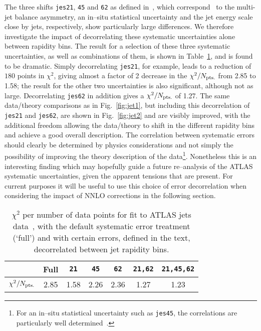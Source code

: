\documentclass{appolb}
\begin{document}
The three shifts \texttt{jes21}, \texttt{45} and \texttt{62} as defined in~\cite{Aad:2014bia}, which correspond~\cite{ATLASpriv} to the multi-jet balance asymmetry, an in--situ statistical uncertainty and the jet energy scale close by jets, respectively, show particularly large differences. We therefore investigate the impact of decorrelating these systematic uncertainties alone between rapidity bins. The result for a selection of these three systematic uncertainties, as well as combinations of them, is shown in Table~\ref{tab:decor},  and is found to be dramatic. Simply decorrelating \texttt{jes21}, for example, leads to a reduction of $180$ points in $\chi^2$, giving almost a factor of 2 decrease in the $\chi^2/N_{\rm pts.}$ from 2.85 to 1.58; the result for the other two uncertainties is also significant, although not as large. Decorrelating \texttt{jes62} in addition gives a $\chi^2/N_{\rm pts.}$ of 1.27. The same data/theory comparisons as in Fig.~\ref{fig:jet1}, but including this decorrelation of \texttt{jes21} and \texttt{jes62}, are shown in Fig.~\ref{fig:jet2} and are visibly improved, with the additional freedom allowing the data/theory to shift in the different rapidity bins and achieve a good overall description. The correlation between systematic errors should clearly be determined by physics considerations and not simply the possibility of improving the theory description of the data\footnote{For an in--situ statistical uncertainty such as \texttt{jes45}, the correlations are particularly well determined~\cite{ATLASpriv}.}. Nonetheless this is an interesting finding which may hopefully guide a future re--analysis of the ATLAS systematic uncertainties, given the apparent tensions that are  present. For current purposes it will be useful to use this choice of error decorrelation when considering the impact of NNLO corrections in the following section.


\begin{table}[h]
\begin{center}
\begin{tabular}{|c|c|c|c|c|c|c|}
\hline
&Full&\texttt{21}&\texttt{45}&\texttt{62}&\texttt{21,62}&\texttt{21,45,62}\\
\hline
$\chi^2/N_{\rm pts.}$&2.85&1.58&2.26&2.36&1.27&1.23\\
\hline
\end{tabular}
\caption{$\chi^2$ per number of data points for fit to ATLAS jets data~\cite{Aad:2014vwa}, with the default systematic error treatment (`full') and with certain errors, defined in the text, decorrelated between jet rapidity bins.}\label{tab:decor}
\end{center}
\end{table}
\end{document}
